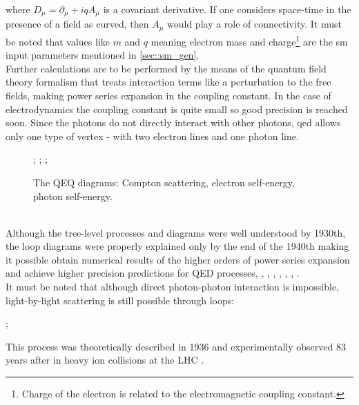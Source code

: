 where $D_{\mu} = \partial_{\mu}+iqA_{\mu}$ is a covariant derivative. If one considers space-time in the presence of a field as curved, then $A_{\mu}$ would play a role of connectivity. It must be noted that values like $m$ and $q$ meaning electron mass and charge\footnote{Charge of the electron is related to the electromagnetic coupling constant.} are the \gls{sm} input parameters mentioned in \ref{sec::sm_gen}.  \\
Further calculations are to be performed by the means of the quantum field theory formalism that treats interaction terms like a perturbation to the free fields, making power series expansion in the coupling constant. In the case of electrodynamics the coupling constant is quite small so good precision is reached soon. Since the photons do not directly interact with other photons, \gls{qed} allows only one type of vertex - with two electron lines and one photon line. \\
\begin{figure}
\label{fig::qed}
\centering
{};
;
;
\caption{The QEQ diagrams: Compton scattering, electron self-energy, photon self-energy.}
\end{figure}
\\
Although the tree-level processes and diagrams were well understood by 1930th, the loop diagrams were properly explained only by the end of the 1940th making it possible obtain numerical results of the higher orders of power series expansion and achieve higher precision predictions for QED processes\cite{Schwinger_covar}, \cite{Schwinger_polariz}, \cite{Feynman_math}, \cite{Feynman_positrons}, \cite{Feynman_spacetime}, \cite{Tomonaga}, \cite{Dyson_all}, \cite{Dyson_smatr}. \\
It must be noted that although direct photon-photon interaction is impossible, light-by-light scattering is still possible through loops:\\

\begin{center}
;\\
\end{center}
This process was theoretically described in 1936 \cite{lbl_th} and experimentally observed 83 years after in heavy ion collisions at the LHC \cite{lbl_exp}.
